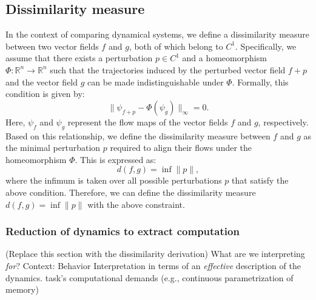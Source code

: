\documentclass{article}
\newcommand{\ascomment}[1]{\textcolor{ascolor}{(#1)}}
\theoremstyle{definition} \newtheorem{definition}{Definition}  \newtheorem{example}{Example}
\theoremstyle{remark} \newtheorem{remark}{Remark}
\newcounter{ct}
\begin{document}
\subsection{Dissimilarity measure}
In the context of comparing dynamical systems, we define a dissimilarity measure between two vector fields \( f \) and \( g \), both of which belong to \( C^1 \).
Specifically, we assume that there exists a perturbation \( p \in C^1 \) and a homeomorphism \( \Phi: \mathbb{R}^n \rightarrow \mathbb{R}^n \) such that the trajectories induced by the perturbed vector field \( f + p \) and the vector field \( g \) can be made indistinguishable under \( \Phi \).
Formally, this condition is given by:
\begin{equation}\label{eq:dissimilarity}
\|\psi_{f+p} - \Phi(\psi_{g})\|_\infty = 0.
\end{equation}
Here, \( \psi_{f} \) and \( \psi_{g} \) represent the flow maps of the vector fields \( f \) and \( g \), respectively. Based on this relationship, we define the dissimilarity measure between \( f \) and \( g \) as the minimal perturbation \( p \) required to align their flows under the homeomorphism \( \Phi \). This is expressed as:
\begin{equation}
d(f, g) = \inf \|p\|,  %
\end{equation}
where the infimum is taken over all possible perturbations \( p \) that satisfy the above condition.
Therefore, we can define the dissimilarity measure $d(f,g) = \inf \|p\|$ with the above constraint.

\subsubsection{Reduction of dynamics to extract computation}
\ascomment{Replace this section with the dissimilarity derivation}
What are we interpreting \emph{for}?
Context: Behavior %
Interpretation in terms of an \emph{effective} description of the dynamics.
task's computational demands (e.g., continuous parametrization of memory)
\end{document}
